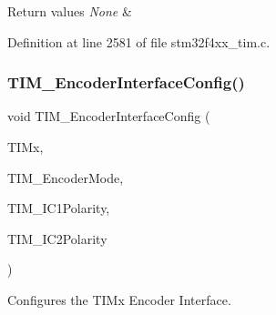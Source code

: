 \begin{DoxyRetVals}{Return values}
{\em None} & \\
\hline
\end{DoxyRetVals}


Definition at line 2581 of file stm32f4xx\+\_\+tim.\+c.

\mbox{\label{group___t_i_m_ga0fc7e76c47a3bd1ba1ebc71427832b51}} 
\subsubsection{\texorpdfstring{T\+I\+M\+\_\+\+Encoder\+Interface\+Config()}{TIM\_EncoderInterfaceConfig()}}
{\footnotesize\ttfamily void T\+I\+M\+\_\+\+Encoder\+Interface\+Config (\begin{DoxyParamCaption}\item[{\hyperlink{struct_t_i_m___type_def}{T\+I\+M\+\_\+\+Type\+Def} $\ast$}]{T\+I\+Mx,  }\item[{uint16\+\_\+t}]{T\+I\+M\+\_\+\+Encoder\+Mode,  }\item[{uint16\+\_\+t}]{T\+I\+M\+\_\+\+I\+C1\+Polarity,  }\item[{uint16\+\_\+t}]{T\+I\+M\+\_\+\+I\+C2\+Polarity }\end{DoxyParamCaption})}



Configures the T\+I\+Mx Encoder Interface. 


